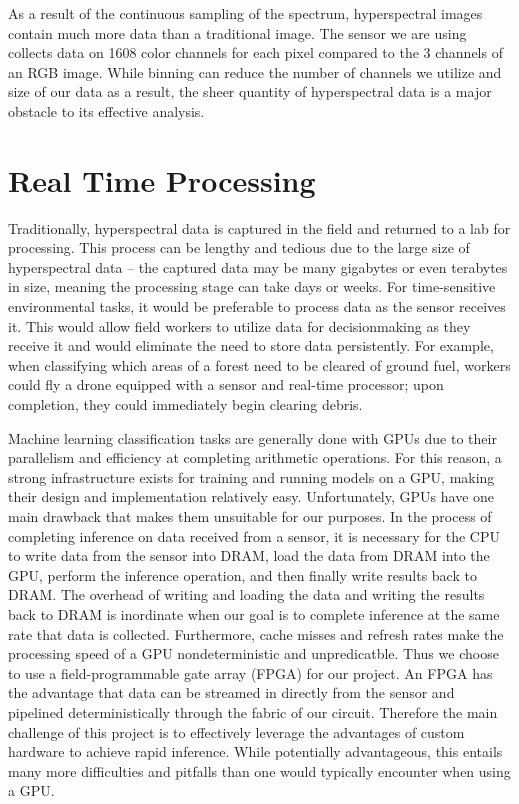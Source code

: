 \documentclass[psamsfonts]{amsart}
\newcommand{\mycomment}[1]{}
\theoremstyle{definition}
\theoremstyle{remark}
\numberwithin{equation}{section}
\begin{document}
As a result of the continuous sampling of the spectrum, hyperspectral images contain much more data than a traditional image. The sensor we are using collects data on 1608 color channels for each pixel compared to the 3 channels of an RGB image. While binning can reduce the number of channels we utilize and size of our data as a result, the sheer quantity of hyperspectral data is a major obstacle to its effective analysis.

\section{Real Time Processing}
Traditionally, hyperspectral data is captured in the field and returned to a lab for processing. This process can be lengthy and tedious due to the large size of hyperspectral data -- the captured data may be many gigabytes or even terabytes in size, meaning the processing stage can take days or weeks.\mycomment{Note: is this true??} For time-sensitive environmental tasks, it would be preferable to process data as the sensor receives it. This would allow field workers to utilize data for decisionmaking as they receive it and would eliminate the need to store data persistently. For example, when classifying which areas of a forest need to be cleared of ground fuel, workers could fly a drone equipped with a sensor and real-time processor; upon completion, they could immediately begin clearing debris.

Machine learning classification tasks are generally done with GPUs due to their parallelism and efficiency at completing arithmetic operations. For this reason, a strong infrastructure exists for training and running models on a GPU, making their design and implementation relatively easy. Unfortunately, GPUs have one main drawback that makes them unsuitable for our purposes. In the process of completing inference on data received from a sensor, it is necessary for the CPU to write data from the sensor into DRAM, load the data from DRAM into the GPU, perform the inference operation, and then finally write results back to DRAM. The overhead of writing and loading the data and writing the results back to DRAM is inordinate when our goal is to complete inference at the same rate that data is collected. Furthermore, cache misses and refresh rates make the processing speed of a GPU nondeterministic and unpredicatble. Thus we choose to use a field-programmable gate array (FPGA) for our project. An FPGA has the advantage that data can be streamed in directly from the sensor and pipelined deterministically through the fabric of our circuit. Therefore the main challenge of this project is to effectively leverage the advantages of custom hardware to achieve rapid inference. While potentially advantageous, this entails many more difficulties and pitfalls than one would typically encounter when using a GPU.
\end{document}
